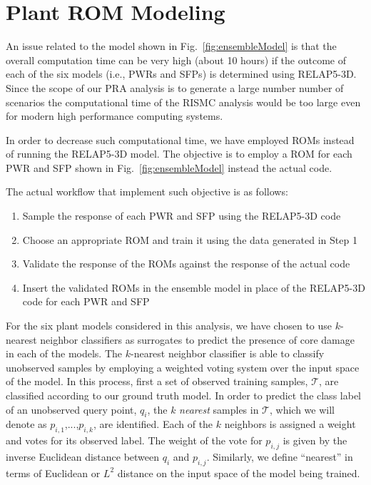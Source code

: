 \section{Plant ROM Modeling}
\label{sec:plantRomModeling}
An issue related to the model shown in Fig.~\ref{fig:ensembleModel} is that the overall 
computation time can be very high (about 10 hours) if the outcome of each of the six 
models (i.e., PWRs and SFPs) is determined using RELAP5-3D.
Since the scope of our PRA analysis is to generate a large number number of scenarios
the computational time of the RISMC analysis would be too large even for modern high 
performance computing systems.

In order to decrease such computational time, we have employed ROMs instead of running 
the RELAP5-3D model. The objective is to employ a ROM for each PWR and SFP shown in 
Fig.~\ref{fig:ensembleModel} instead the actual code.

The actual workflow that implement such objective is as follows:
\begin{enumerate}
  \item Sample the response of each PWR and SFP using the RELAP5-3D code
  \item Choose an appropriate ROM and train it using the data generated in Step 1
  \item Validate the response of the ROMs against the response of the actual code
  \item Insert the validated ROMs in the ensemble model in place of the RELAP5-3D 
        code for each PWR and SFP
\end{enumerate}

\newcommand{\DPM}[1]{\textcolor{magenta}{#1}}

For the six plant models considered in this analysis, we have chosen to use $k$-nearest neighbor classifiers as surrogates to predict the presence of core damage in each of the models.
%
The $k$-nearest neighbor classifier is able to classify unobserved samples by employing a weighted voting system over the input space of the model.
%
In this process, first a set of observed training samples, $\mathcal{T}$, are classified according to our ground truth model.
%
In order to predict the class label of an unobserved query point, $q_i$, the $k$ \emph{nearest} samples in $\mathcal{T}$, which we will denote as $p_{i,1}$,...,$p_{i,k}$, are identified.
%
Each of the $k$ neighbors is assigned a weight and votes for its observed label.
%
The weight of the vote for $p_{i,j}$ is given by the inverse Euclidean distance between $q_i$ and $p_{i,j}$.
%
Similarly, we define ``nearest'' in terms of Euclidean or $L^2$ distance on the input space of the model being trained.

